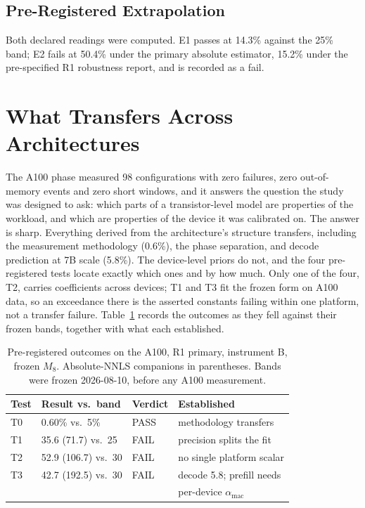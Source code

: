 \documentclass[conference]{IEEEtran}
\begin{document}
\subsection{Pre-Registered Extrapolation}

Both declared readings were computed. E1 passes at 14.3\% against the 25\%
band; E2 fails at 50.4\% under the primary absolute estimator, 15.2\% under
the pre-specified R1 robustness report, and is recorded as a fail.

\section{What Transfers Across Architectures}
\label{sec:transfer}

The A100 phase measured 98 configurations with zero failures, zero
out-of-memory events and zero short windows, and it answers the question the
study was designed to ask: which parts of a transistor-level model are
properties of the workload, and which are properties of the device it was
calibrated on. The answer is sharp. Everything derived from the
architecture's structure transfers, including the measurement methodology
(0.6\%), the phase separation, and decode prediction at 7B scale (5.8\%).
The device-level priors do not, and the four pre-registered tests locate
exactly which ones and by how much. Only one of the four, T2, carries
coefficients across devices; T1 and T3 fit the frozen form on A100 data, so
an exceedance there is the asserted constants failing within one platform,
not a transfer failure. Table~\ref{tab:verdicts} records the
outcomes as they fell against their frozen bands, together with what each
established.

\begin{table}[t]
\caption{Pre-registered outcomes on the A100, R1 primary, instrument B,
frozen $M_8$. Absolute-NNLS companions in parentheses. Bands were frozen
2026-08-10, before any A100 measurement.}
\label{tab:verdicts}
\centering
\small
\begin{tabular}{@{}llll@{}}
\toprule
Test & Result vs.\ band & Verdict & Established \\
\midrule
T0 & 0.60\% vs.\ 5\% & PASS & methodology transfers \\
T1 & 35.6 (71.7) vs.\ 25 & FAIL & precision splits the fit \\
T2 & 52.9 (106.7) vs.\ 30 & FAIL & no single platform scalar \\
T3 & 42.7 (192.5) vs.\ 30 & FAIL & decode 5.8; prefill needs \\
   &                     &      & per-device $\alpha_{\mathrm{mac}}$ \\
\bottomrule
\end{tabular}
\end{table}
\end{document}
